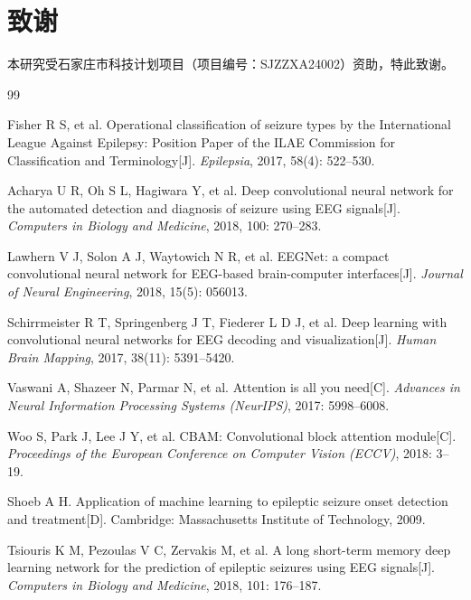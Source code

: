 \documentclass[12pt, a4paper]{article}
\begin{document}
\section*{致\quad 谢}

本研究受石家庄市科技计划项目（项目编号：SJZZXA24002）资助，特此致谢。

\begin{thebibliography}{99}

Fisher R S, et al. Operational classification of seizure types by the International League Against Epilepsy: Position Paper of the ILAE Commission for Classification and Terminology[J]. \emph{Epilepsia}, 2017, 58(4): 522--530.

Acharya U R, Oh S L, Hagiwara Y, et al. Deep convolutional neural network for the automated detection and diagnosis of seizure using EEG signals[J]. \emph{Computers in Biology and Medicine}, 2018, 100: 270--283.

Lawhern V J, Solon A J, Waytowich N R, et al. EEGNet: a compact convolutional neural network for EEG-based brain-computer interfaces[J]. \emph{Journal of Neural Engineering}, 2018, 15(5): 056013.

Schirrmeister R T, Springenberg J T, Fiederer L D J, et al. Deep learning with convolutional neural networks for EEG decoding and visualization[J]. \emph{Human Brain Mapping}, 2017, 38(11): 5391--5420.

Vaswani A, Shazeer N, Parmar N, et al. Attention is all you need[C]. \emph{Advances in Neural Information Processing Systems (NeurIPS)}, 2017: 5998--6008.

Woo S, Park J, Lee J Y, et al. CBAM: Convolutional block attention module[C]. \emph{Proceedings of the European Conference on Computer Vision (ECCV)}, 2018: 3--19.

Shoeb A H. Application of machine learning to epileptic seizure onset detection and treatment[D]. Cambridge: Massachusetts Institute of Technology, 2009.

Tsiouris K M, Pezoulas V C, Zervakis M, et al. A long short-term memory deep learning network for the prediction of epileptic seizures using EEG signals[J]. \emph{Computers in Biology and Medicine}, 2018, 101: 176--187.


\end{thebibliography}
\end{document}
